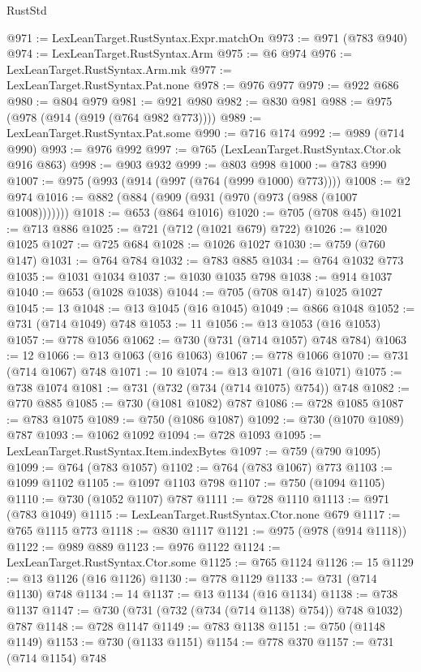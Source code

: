 \begin{lexlean}{RustStd}
\begin{coremodule}
@971 := LexLeanTarget.RustSyntax.Expr.matchOn
@973 := @971 (@783 @940)
@974 := LexLeanTarget.RustSyntax.Arm
@975 := @6 @974
@976 := LexLeanTarget.RustSyntax.Arm.mk
@977 := LexLeanTarget.RustSyntax.Pat.none
@978 := @976 @977
@979 := @922 @686
@980 := @804 @979
@981 := @921 @980
@982 := @830 @981
@988 := @975 (@978 (@914 (@919 (@764 @982 @773))))
@989 := LexLeanTarget.RustSyntax.Pat.some
@990 := @716 @174
@992 := @989 (@714 @990)
@993 := @976 @992
@997 := @765 (LexLeanTarget.RustSyntax.Ctor.ok @916 @863)
@998 := @903 @932
@999 := @803 @998
@1000 := @783 @990
@1007 := @975 (@993 (@914 (@997 (@764 (@999 @1000) @773))))
@1008 := @2 @974
@1016 := @882 (@884 (@909 (@931 (@970 (@973 (@988 (@1007 @1008)))))))
@1018 := @653 (@864 @1016)
@1020 := @705 (@708 @45)
@1021 := @713 @886
@1025 := @721 (@712 (@1021 @679) @722)
@1026 := @1020 @1025
@1027 := @725 @684
@1028 := @1026 @1027
@1030 := @759 (@760 @147)
@1031 := @764 @784
@1032 := @783 @885
@1034 := @764 @1032 @773
@1035 := @1031 @1034
@1037 := @1030 @1035 @798
@1038 := @914 @1037
@1040 := @653 (@1028 @1038)
@1044 := @705 (@708 @147) @1025 @1027
@1045 := 13
@1048 := @13 @1045 (@16 @1045)
@1049 := @866 @1048
@1052 := @731 (@714 @1049) @748
@1053 := 11
@1056 := @13 @1053 (@16 @1053)
@1057 := @778 @1056
@1062 := @730 (@731 (@714 @1057) @748 @784)
@1063 := 12
@1066 := @13 @1063 (@16 @1063)
@1067 := @778 @1066
@1070 := @731 (@714 @1067) @748
@1071 := 10
@1074 := @13 @1071 (@16 @1071)
@1075 := @738 @1074
@1081 := @731 (@732 (@734 (@714 @1075) @754)) @748
@1082 := @770 @885
@1085 := @730 (@1081 @1082) @787
@1086 := @728 @1085
@1087 := @783 @1075
@1089 := @750 (@1086 @1087)
@1092 := @730 (@1070 @1089) @787
@1093 := @1062 @1092
@1094 := @728 @1093
@1095 := LexLeanTarget.RustSyntax.Item.indexBytes
@1097 := @759 (@790 @1095)
@1099 := @764 (@783 @1057)
@1102 := @764 (@783 @1067) @773
@1103 := @1099 @1102
@1105 := @1097 @1103 @798
@1107 := @750 (@1094 @1105)
@1110 := @730 (@1052 @1107) @787
@1111 := @728 @1110
@1113 := @971 (@783 @1049)
@1115 := LexLeanTarget.RustSyntax.Ctor.none @679
@1117 := @765 @1115 @773
@1118 := @830 @1117
@1121 := @975 (@978 (@914 @1118))
@1122 := @989 @889
@1123 := @976 @1122
@1124 := LexLeanTarget.RustSyntax.Ctor.some
@1125 := @765 @1124
@1126 := 15
@1129 := @13 @1126 (@16 @1126)
@1130 := @778 @1129
@1133 := @731 (@714 @1130) @748
@1134 := 14
@1137 := @13 @1134 (@16 @1134)
@1138 := @738 @1137
@1147 := @730 (@731 (@732 (@734 (@714 @1138) @754)) @748 @1032) @787
@1148 := @728 @1147
@1149 := @783 @1138
@1151 := @750 (@1148 @1149)
@1153 := @730 (@1133 @1151)
@1154 := @778 @370
@1157 := @731 (@714 @1154) @748

\end{coremodule}
\end{lexlean}

